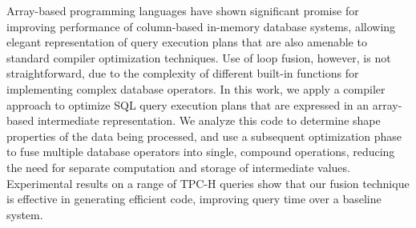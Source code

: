 Array-based programming languages have shown significant promise for
improving performance of column-based in-memory database systems,
allowing elegant representation of query execution plans that are
also amenable to standard compiler optimization techniques.
Use of loop fusion, however, is not straightforward, due to the
complexity of different built-in functions for implementing complex database operators.
In this work, we apply a compiler approach to optimize SQL query execution
plans that are expressed in an array-based intermediate representation. We
analyze this code to 
determine shape properties of the data being
processed, and use a subsequent optimization phase to fuse multiple database
operators into single, compound operations, reducing the need for separate
computation and storage of intermediate values.  Experimental results on a
range of TPC-H queries show that our fusion technique is effective in
generating efficient code, improving query time over a baseline system.




